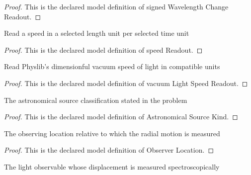 \begin{proof}
  This is the declared model definition of signed Wavelength Change Readout.
\end{proof}
\begin{definition}
  \label{def:physics:phyx-mini-0567:phyxminiproblems-problemphyxmini0567-speedreadout}
  Read a speed in a selected length unit per selected time unit
\end{definition}
\begin{proof}
  This is the declared model definition of speed Readout.
\end{proof}
\begin{definition}
  \label{def:physics:phyx-mini-0567:phyxminiproblems-problemphyxmini0567-vacuumlightspeedreadout}
  Read Physlib's dimensionful vacuum speed of light in compatible units
\end{definition}
\begin{proof}
  This is the declared model definition of vacuum Light Speed Readout.
\end{proof}
\begin{definition}
  \label{def:physics:phyx-mini-0567:phyxminiproblems-problemphyxmini0567-astronomicalsourcekind}
  The astronomical source classification stated in the problem
\end{definition}
\begin{proof}
  This is the declared model definition of Astronomical Source Kind.
\end{proof}
\begin{definition}
  \label{def:physics:phyx-mini-0567:phyxminiproblems-problemphyxmini0567-observerlocation}
  The observing location relative to which the radial motion is measured
\end{definition}
\begin{proof}
  This is the declared model definition of Observer Location.
\end{proof}
\begin{definition}
  \label{def:physics:phyx-mini-0567:phyxminiproblems-problemphyxmini0567-lightsignalkind}
  The light observable whose displacement is measured spectroscopically
\end{definition}
